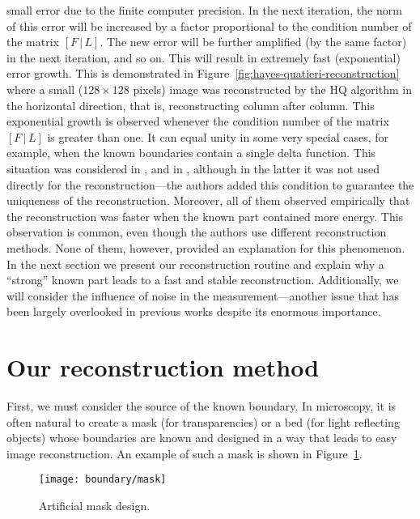 small error due to the finite computer precision. In the next
iteration, the norm of this error will be increased by a factor
proportional to the condition number of the matrix
$[F\,\vert\,L]$. The new error will be further amplified (by the same
factor) in the next iteration, and so on. This will result in
extremely fast (exponential) error growth. This is demonstrated in
Figure~\ref{fig:hayes-quatieri-reconstruction} where a small
($128\times128$ pixels) image was reconstructed by the HQ algorithm in
the horizontal direction, that is, reconstructing column after
column. This exponential growth is observed whenever the condition
number of the matrix $[F\,\vert\,L]$ is greater than one. It can
equal unity in some very special cases, for example, when the known
boundaries contain a single delta function. This situation was
considered in , and in
, although in the latter it was not used
directly for the reconstruction---the authors added this condition to
guarantee the uniqueness of the reconstruction. Moreover, all of them
observed empirically that the reconstruction was faster when the known
part contained more energy. This observation is common, even though
the authors use different reconstruction methods. None of them,
however, provided an explanation for this phenomenon. In the next
section we present our reconstruction routine and explain why a
``strong'' known part leads to a fast and stable reconstruction.
Additionally, we will consider the influence of noise in the
measurement---another issue that has been largely overlooked in 
previous works despite its enormous importance.

\section{Our reconstruction method}
\label{sec:our-reconstr-meth}
First, we must consider the source of the known boundary. In
microscopy, it is often natural to create a mask (for transparencies)
or a bed (for light reflecting objects) whose boundaries are known and
designed in a way that leads to easy image reconstruction. An example of
such a mask is shown in Figure~\ref{fig:mask}.

\begin{figure}[H]
  \centering
  \texttt{[image: boundary/mask]}
  \caption{Artificial mask design.}
  \label{fig:mask}
\end{figure}


